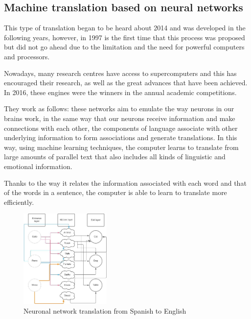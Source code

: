 \documentclass[a4paper]{article}
\theoremstyle{plain}
\theoremstyle{definition}
\begin{document}
    \subsection{Machine translation based on neural networks}
	
	This type of translation began to be heard about 2014 and was developed in the following years, however, in 1997 is the first time that this process was proposed but did not go ahead due to the limitation and the need for powerful computers and processors.\newline

         

    Nowadays, many research centres have access to supercomputers and this has encouraged their research, as well as the great advances that have been achieved. In 2016, these engines were the winners in the annual academic competitions.\newline
        
     
    They work as follows: these networks aim to emulate the way neurons in our brains work, in the same way that our neurons receive information and make connections with each other, the components of language associate with other underlying information to form associations and generate translations. In this way, using machine learning techniques, the computer learns to translate from large amounts of parallel text that also includes all kinds of linguistic and emotional information.\newline
     
    \newline
    Thanks to the way it relates the information associated with each word and that of the words in a sentence, the computer is able to learn to translate more efficiently.\newline
    \begin{figure}[h]
        \centering
        
        \includegraphics[width=0.4\textwidth]{neuronal.jpeg}
        \caption{Neuronal network translation from Spanish to English}
    \end{figure}
   
\end{document}
